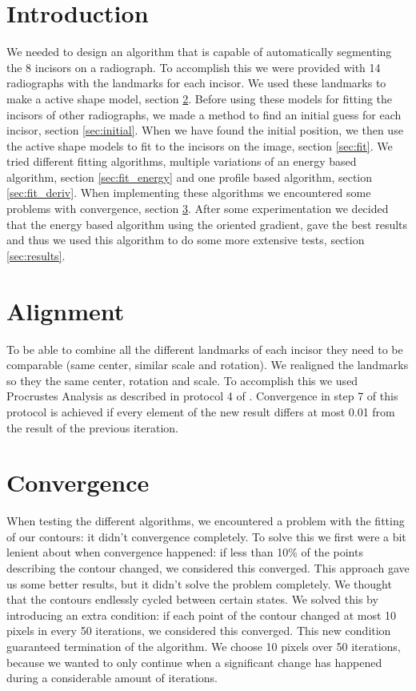 \documentclass[a4paper,10pt]{article}
\begin{document}


\tableofcontents
\newpage

\section{Introduction}\label{sec:introduction}
We needed to design an algorithm that is capable of automatically segmenting the 8 incisors on a radiograph.
To accomplish this we were provided with 14 radiographs with the landmarks for each incisor. We used these landmarks to make a active shape model, section \ref{sec:alignment}. Before using these models for fitting the incisors of other radiographs, we made a method to find an initial guess for each incisor, section \ref{sec:initial}. When we have found the initial position, we then use the active shape models to fit to the incisors on the image, section \ref{sec:fit}. We tried different fitting algorithms, multiple variations of an energy based algorithm, section \ref{sec:fit_energy} and one profile based algorithm, section \ref{sec:fit_deriv}. When implementing these algorithms we encountered some problems with convergence, section \ref{sec:convergence}. After some experimentation we decided that the energy based algorithm using the oriented gradient, gave the best results and thus we used this algorithm to do some more extensive tests, section \ref{sec:results}.


\section{Alignment} \label{sec:alignment}
To be able to combine all the different landmarks of each incisor they need to be comparable (same center, similar scale and rotation). We realigned the landmarks so they the same center, rotation and scale. To accomplish this we used Procrustes Analysis as described in protocol 4 of \cite{TemplateAlgorithm}. Convergence in step 7 of this protocol is achieved if every element of the new result differs at most 0.01 from the result of the previous iteration.

\section{Convergence}\label{sec:convergence}
When testing the different algorithms, we encountered a problem with the fitting of our contours: it didn't convergence completely. To solve this we first were a bit lenient about when convergence happened: if less than 10\% of the points describing the contour changed, we considered this converged. This approach gave us some better results, but it didn't solve the problem completely. We thought that the contours endlessly cycled between certain states. We solved this by introducing an extra condition: if each point of the contour changed at most 10 pixels in every 50 iterations, we considered this converged. This new condition guaranteed termination of the algorithm. We choose 10 pixels over 50 iterations, because we wanted to only continue when a significant change has happened during a considerable amount of iterations.
\end{document}
